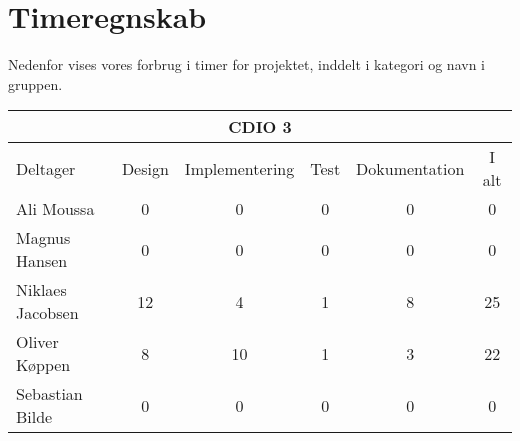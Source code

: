 \chapter{Timeregnskab}

Nedenfor vises vores forbrug i timer for projektet, inddelt i kategori og navn i gruppen.

\begin{table}[h]
    \centering
        \begin{tabular}{|l|c|c|c|c|c|}
                \hline
            \multicolumn{6}{|c|}{CDIO 3}

                \\ \hline
                                Deltager            &       Design      &      Implementering    &      Test     &       Dokumentation        &       I alt
                \\ \hline

                                Ali Moussa          &         0        &             0           &        0      &             0              &          0
                \\ \hline

                                Magnus Hansen       &         0        &             0           &        0      &             0              &          0
                \\ \hline

                                Niklaes Jacobsen    &         12       &             4           &        1      &             8              &          25
                \\ \hline

                                Oliver Køppen       &         8        &             10           &        1      &             3              &          22
                \\ \hline

                                Sebastian Bilde     &         0        &             0           &        0      &             0              &          0
                \\ \hline

        \end{tabular}
\end{table}